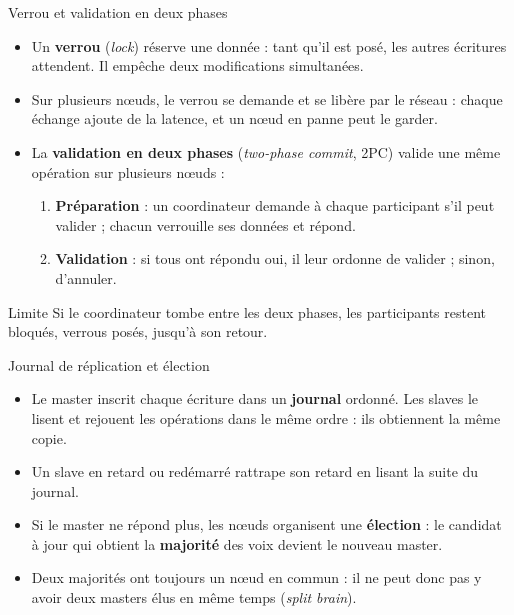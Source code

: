 \begin{frame}{Verrou et validation en deux phases}
    \begin{itemize}
        \item Un \textbf{verrou} (\textit{lock}) réserve une donnée : tant qu'il
              est posé, les autres écritures attendent. Il empêche deux
              modifications simultanées.
        \item Sur plusieurs nœuds, le verrou se demande et se libère par le
              réseau : chaque échange ajoute de la latence, et un nœud en panne
              peut le garder.
        \item La \textbf{validation en deux phases} (\textit{two-phase commit},
              2PC) valide une même opération sur plusieurs nœuds :
              \begin{enumerate}
                  \item \textbf{Préparation} : un coordinateur demande à chaque
                        participant s'il peut valider ; chacun verrouille ses
                        données et répond.
                  \item \textbf{Validation} : si tous ont répondu oui, il leur
                        ordonne de valider ; sinon, d'annuler.
              \end{enumerate}
    \end{itemize}

    \begin{examplebox}{Limite}
        Si le coordinateur tombe entre les deux phases, les participants restent
        bloqués, verrous posés, jusqu'à son retour.
    \end{examplebox}
\end{frame}

\begin{frame}{Journal de réplication et élection}
    \begin{itemize}
        \item Le master inscrit chaque écriture dans un \textbf{journal}
              ordonné. Les slaves le lisent et rejouent les opérations dans le
              même ordre : ils obtiennent la même copie.
        \item Un slave en retard ou redémarré rattrape son retard en lisant la
              suite du journal.
        \item Si le master ne répond plus, les nœuds organisent une
              \textbf{élection} : le candidat à jour qui obtient la
              \textbf{majorité} des voix devient le nouveau master.
        \item Deux majorités ont toujours un nœud en commun : il ne peut donc
              pas y avoir deux masters élus en même temps (\textit{split
              brain}).
    \end{itemize}

\end{frame}

